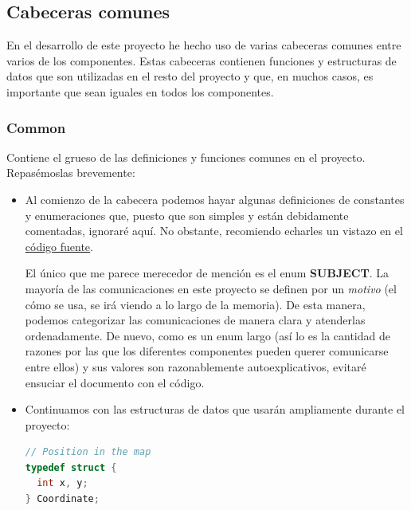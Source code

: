\documentclass[a4paper,12pt]{article}
\begin{document}
\subsection{Cabeceras comunes}
En el desarrollo de este proyecto he hecho uso de varias cabeceras comunes entre varios de los componentes. Estas cabeceras
contienen funciones y estructuras de datos que son utilizadas en el resto del proyecto y que, en muchos casos, es importante
que sean iguales en todos los componentes.
\subsubsection{Common}
Contiene el grueso de las definiciones y funciones comunes en el proyecto. Repasémoslas brevemente:
\begin{itemize}
  \item Al comienzo de la cabecera podemos hayar algunas definiciones de constantes y enumeraciones que, puesto que son simples y están debidamente comentadas,
        ignoraré aquí. No obstante, recomiendo echarles un vistazo en el \href{https://github.com/abtb2-ua/easycab/blob/main/src/common.h}{código fuente}. \par
        El único que me parece merecedor de mención es el enum \textbf{SUBJECT}. La mayoría de las comunicaciones en este proyecto se definen por un
        \textit{motivo} (el cómo se usa, se irá viendo a lo largo de la memoria). De esta manera, podemos categorizar las comunicaciones de manera clara y atenderlas ordenadamente.
        De nuevo, como es un enum largo (así lo es la cantidad de razones por las que los diferentes componentes pueden querer comunicarse entre ellos)
        y sus valores son razonablemente autoexplicativos, evitaré ensuciar el documento con el código.
  \item Continuamos con las estructuras de datos que usarán ampliamente durante el proyecto:
        \begin{lstlisting}[language=C]
// Position in the map
typedef struct {
  int x, y;
} Coordinate;


\end{lstlisting}
\end{itemize}
\end{document}

